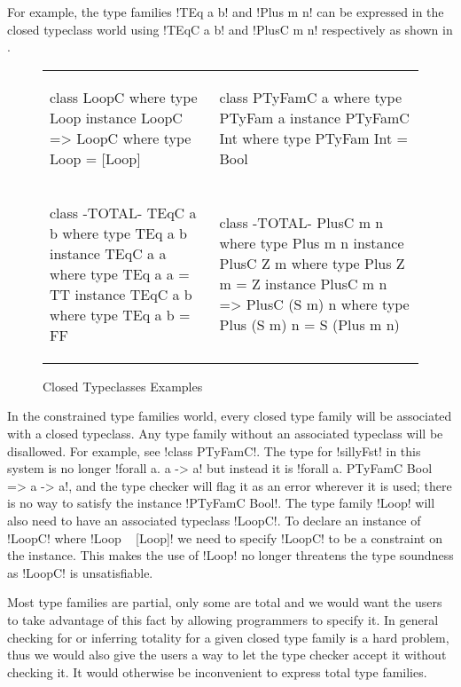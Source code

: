 \documentclass[format=acmsmall,manuscript,review,screen,nonacm,margin=1in,11pt]{acmart}
\begin{document}
For example, the type families !TEq a b! and !Plus m n! can be expressed
in the closed typeclass world using !TEqC a b! and !PlusC m n! respectively as shown in .
\begin{figure}[ht]
    \footnotesize
  \begin{tabular}{l l}
\begin{code}
class LoopC where
  type Loop
  instance LoopC => LoopC where
    type Loop = [Loop]
\end{code}&%
\begin{code}
class PTyFamC a where
  type PTyFam a
  instance PTyFamC Int where
    type PTyFam Int = Bool
\end{code}\\    
\begin{code}
class {-TOTAL-} TEqC a b where
  type TEq a b
  instance TEqC a a where
    type TEq a a = TT
  instance TEqC a b where
    type TEq a b = FF  
\end{code}&%
\begin{code}
class {-TOTAL-} PlusC m n where
  type Plus m n
  instance PlusC Z m where
    type Plus Z m = Z
  instance PlusC m n => PlusC (S m) n where
    type Plus (S m) n = S (Plus m n)  
\end{code}
  \end{tabular}
  \caption{Closed Typeclasses Examples}
  \label{fig:closed-tc-examples}
\end{figure}
In the constrained type families world, every closed type family will be associated with
a closed typeclass. Any type family without an associated typeclass will be disallowed.
For example, see !class PTyFamC!. The type for !sillyFst! in this system is no longer
!forall a. a -> a! but instead it is !forall a. PTyFamC Bool => a -> a!, and the type
checker will flag it as an error wherever it is used; there is no way to satisfy
the instance !PTyFamC Bool!. The type family !Loop! will also need to have
an associated typeclass !LoopC!. To declare an instance of !LoopC!
where !Loop ~ [Loop]! we need to specify !LoopC! to be a constraint on the instance.
This makes the use of !Loop! no longer threatens the type soundness as !LoopC! is unsatisfiable.

Most type families are partial, only some are total and we would want
the users to take advantage of this fact by allowing programmers to specify it.
In general checking for or inferring totality for a given closed type family is a hard problem, thus
we would also give the users a way to let the type checker accept it without checking it.
It would otherwise be inconvenient to express total type families. 
\end{document}
